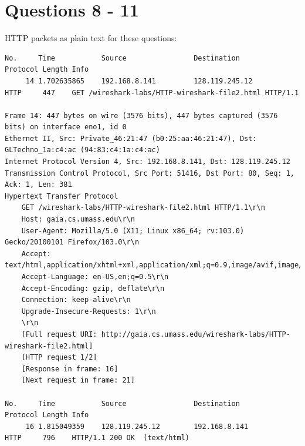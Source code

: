\documentclass[a4paper,11pt,final]{report}
\begin{document}
\chapter{Questions 8 - 11}

HTTP packets as plain text for these questions:
\begin{lstlisting}[breaklines]
No.     Time           Source                Destination           Protocol Length Info
     14 1.702635865    192.168.8.141         128.119.245.12        HTTP     447    GET /wireshark-labs/HTTP-wireshark-file2.html HTTP/1.1 

Frame 14: 447 bytes on wire (3576 bits), 447 bytes captured (3576 bits) on interface eno1, id 0
Ethernet II, Src: Private_46:21:47 (b0:25:aa:46:21:47), Dst: GLTechno_1a:c4:ac (94:83:c4:1a:c4:ac)
Internet Protocol Version 4, Src: 192.168.8.141, Dst: 128.119.245.12
Transmission Control Protocol, Src Port: 51416, Dst Port: 80, Seq: 1, Ack: 1, Len: 381
Hypertext Transfer Protocol
    GET /wireshark-labs/HTTP-wireshark-file2.html HTTP/1.1\r\n
    Host: gaia.cs.umass.edu\r\n
    User-Agent: Mozilla/5.0 (X11; Linux x86_64; rv:103.0) Gecko/20100101 Firefox/103.0\r\n
    Accept: text/html,application/xhtml+xml,application/xml;q=0.9,image/avif,image/webp,*/*;q=0.8\r\n
    Accept-Language: en-US,en;q=0.5\r\n
    Accept-Encoding: gzip, deflate\r\n
    Connection: keep-alive\r\n
    Upgrade-Insecure-Requests: 1\r\n
    \r\n
    [Full request URI: http://gaia.cs.umass.edu/wireshark-labs/HTTP-wireshark-file2.html]
    [HTTP request 1/2]
    [Response in frame: 16]
    [Next request in frame: 21]

No.     Time           Source                Destination           Protocol Length Info
     16 1.815049359    128.119.245.12        192.168.8.141         HTTP     796    HTTP/1.1 200 OK  (text/html)


\end{lstlisting}
\end{document}
